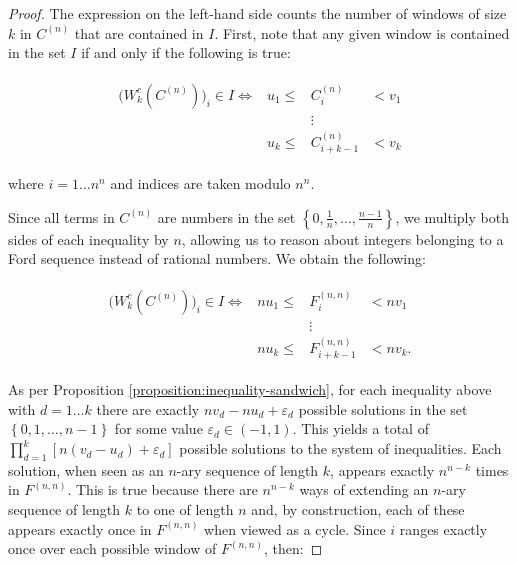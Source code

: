 \documentclass[11pt,a4paper]{tesis}
\theoremstyle{plain}
\theoremstyle{definition}
\begin{document}
\begin{proof}
  The expression on the left-hand side counts the number of windows of size $k$ in $C^{(n)}$ that are contained in $I$. First, note that any given window is contained in the set $I$ if and only if the following is true:
  
  \begin{equation*}
    \begin{aligned}
        \begin{array}{cccc}
          \big( W_k^{c}(C^{(n)}) \big)_i \in I \Longleftrightarrow & u_1 \le & C^{(n)}_{i}         & < v_1 \\
                              & & \vdots & \\
                              & u_k \le & C^{(n)}_{i + k - 1} & < v_k
        \end{array}
    \end{aligned}
  \end{equation*}
  
  where $i = 1 \dots n^n$ and indices are taken modulo $n^n$.

   Since all terms in $C^{(n)}$ are numbers in the set $ \left \{ 0, \frac{1}{n}, \dots, \frac{n - 1}{n} \right \}$, we multiply both sides of each inequality by $n$, allowing us to reason about integers belonging to a Ford sequence instead of rational numbers. We obtain the following:

  \begin{equation*}
    \begin{aligned}
        \begin{array}{cccc}
          \big( W_k^{c}(C^{(n)}) \big)_i \in I \Longleftrightarrow & n u_1 \le & F^{(n, n)}_{i}         & < n v_1 \\
                              & & \vdots & \\
                              & n u_k \le & F^{(n, n)}_{i + k - 1} & < n v_k \text{.}
        \end{array}
    \end{aligned}
  \end{equation*}

  As per Proposition \ref{proposition:inequality-sandwich}, for each inequality above with $d = 1 \dots k$ there are exactly $n v_d - n u_d + \varepsilon_d$ possible solutions in the set $ \left \{ 0, 1, \dots, n - 1 \right \} $ for some value $\varepsilon_d \in (-1, 1)$. This yields a total of $\prod_{d = 1}^{k} [n (v_d - u_d) + \varepsilon_d]$ possible solutions to the system of inequalities. Each solution, when seen as an $n$-ary sequence of length $k$, appears exactly $n^{n - k}$ times in $F^{(n, n)}$. This is true because there are  $n^{n - k}$ ways of extending an $n$-ary sequence of length $k$ to one of length $n$ and, by construction, each of these appears exactly once in $F^{(n, n)}$ when viewed as a cycle. Since $i$ ranges exactly once over each possible window of $F^{(n, n)}$, then:


\end{proof}
\end{document}
